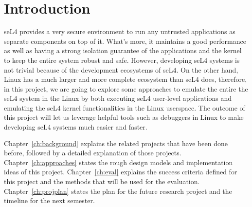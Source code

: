 \chapter{Introduction}\label{ch:intro}

seL4 provides a very secure environment to run any untrusted applications as separate components on top of it. What's more, it maintains a good performance as well as having a strong isolation guarantee of the applications and the kernel to keep the entire system robust and safe. However, developing seL4 systems is not trivial because of the development ecosystems of seL4. On the other hand, Linux has a much larger and more complete ecosystem than seL4 does, therefore, in this project, we are going to explore some approaches to emulate the entire the seL4 system in the Linux by both executing seL4 user-level applications and emulating the seL4 kernel functionalities in the Linux userspace. The outcome of this project will let us leverage helpful tools such as debuggers in Linux to make developing seL4 systems much easier and faster.

Chapter~\ref{ch:background} explains the related projects that have been done before, followed by a detailed explanation of those projects.
Chapter~\ref{ch:approaches} states the rough design models and implementation ideas of this project.
Chapter~\ref{ch:eval} explains the success criteria defined for this project and the methods that will be used for the evaluation.
Chapter~\ref{ch:projplan} states the plan for the future research project and the timeline for the next semester.